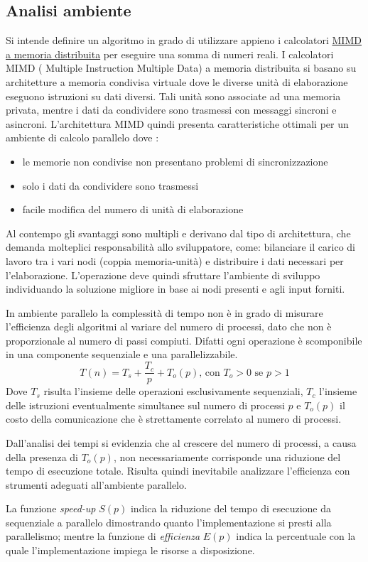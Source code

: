 \documentclass[a4paper,11pt]{book}
\begin{document}
\subsection{Analisi ambiente}
Si intende definire un algoritmo in grado di utilizzare appieno i calcolatori \underline{MIMD a memoria distribuita} per eseguire una somma di numeri reali. I calcolatori MIMD ( Multiple Instruction Multiple Data) a memoria distribuita si basano su architetture a memoria condivisa virtuale dove le diverse unità di elaborazione eseguono istruzioni su dati diversi. Tali unità sono associate ad una memoria privata, mentre i dati da condividere sono trasmessi con messaggi sincroni e asincroni. L'architettura MIMD quindi presenta caratteristiche ottimali per un ambiente di calcolo parallelo dove : 
\begin{itemize}
    \item le memorie non condivise non presentano problemi di sincronizzazione
    \item solo i dati da condividere sono trasmessi
    \item facile modifica del numero di unità di elaborazione
\end{itemize}
Al contempo gli svantaggi sono multipli e derivano dal tipo di architettura, che demanda molteplici responsabilità allo sviluppatore, come: bilanciare il carico di lavoro tra i vari nodi (coppia memoria-unità) e distribuire i dati necessari per l'elaborazione. 
L'operazione deve quindi sfruttare l'ambiente di sviluppo individuando la soluzione migliore in base ai nodi presenti e agli input forniti. \par 
\label{cenni_complessita}
In ambiente parallelo la complessità di tempo non è in grado di misurare l'efficienza degli algoritmi al variare del numero di processi, dato che non è proporzionale al numero di passi compiuti. Difatti ogni operazione è scomponibile in una componente sequenziale e una parallelizzabile.
\begin{equation}
    T(n) = T_s + \frac{T_c}{p}+ T_o(p) \mbox{, con } T_o > 0 \mbox{ se } p > 1
\end{equation}
Dove $T_s$ risulta l'insieme delle operazioni esclusivamente sequenziali, $T_c$ l'insieme delle istruzioni eventualmente simultanee sul numero di processi $p$ e $T_o(p)$ il costo della comunicazione che è strettamente correlato al numero di processi. \par 
Dall'analisi dei tempi si evidenzia che al crescere del numero di processi, a causa della presenza di $T_o(p)$, non necessariamente corrisponde una riduzione del tempo di esecuzione totale. Risulta quindi inevitabile analizzare l'efficienza con strumenti adeguati all'ambiente parallelo.\par 
La funzione \textit{speed-up} $S(p)$ indica la riduzione del tempo di esecuzione da sequenziale a parallelo dimostrando quanto l'implementazione si presti alla parallelismo; mentre la funzione di \textit{efficienza} $E(p)$ indica la percentuale con la quale l'implementazione impiega le risorse a disposizione.
\end{document}
